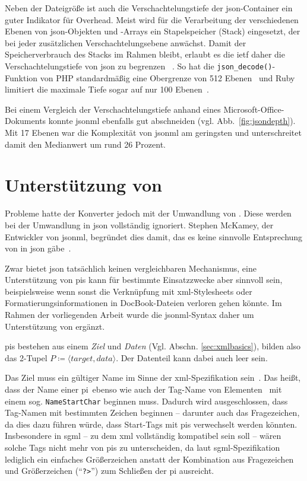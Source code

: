 Neben der Dateigröße ist auch die Verschachtelungstiefe der \acrshort{json}-Container ein guter Indikator für Overhead. Meist wird für die Verarbeitung der verschiedenen Ebenen von \acrshort{json}-Objekten und -Arrays ein Stapelspeicher (Stack) eingesetzt, der bei jeder zusätzlichen Verschachtelungsebene anwächst. Damit der Speicherverbrauch des Stacks im Rahmen bleibt, erlaubt es die \acrshort{ietf} daher die Verschachtelungstiefe von \acrshort{json} zu begrenzen ~\cite[Abschn.~9]{rfc7159}. So hat die \texttt{json_decode()}-Funktion von PHP standardmäßig eine Obergrenze von 512 Ebenen~\cite{php-json} und Ruby limitiert die maximale Tiefe sogar auf nur 100 Ebenen~\cite{ruby-json}.

Bei einem Vergleich der Verschachtelungstiefe anhand eines Microsoft\hyp{}Office\hyp{}Dokuments konnte \acrshort{jsonml} ebenfalls gut abschneiden (vgl. Abb.~\ref{fig:jsondepth}). Mit 17 Ebenen war die Komplexität von \acrshort{jsonml} am geringsten und unterschreitet damit den Medianwert um rund 26 Prozent.

\section{Unterstützung von }

Probleme hatte der Konverter jedoch mit der Umwandlung von . Diese werden bei der Umwandlung in \acrshort{json} vollständig ignoriert. Stephen McKamey, der Entwickler von \acrshort{jsonml}, begründet dies damit, das es keine sinnvolle Entsprechung von  in \acrshort{json} gäbe~\cite{mckamey2006xml}.

Zwar bietet \acrshort{json} tatsächlich keinen vergleichbaren Mechanismus, eine Unterstützung von \glspl{pi} kann für bestimmte Einsatzzwecke aber sinnvoll sein, beispielsweise wenn sonst die Verknüpfung mit \acrshort{xml}-Stylesheets oder Formatierungsinformationen in DocBook\hyp{}Dateien verloren gehen könnte. Im Rahmen der vorliegenden Arbeit wurde die \acrshort{jsonml}-Syntax daher um Unterstützung von  ergänzt.

\glspl{pi} bestehen aus einem \emph{Ziel} und \emph{Daten} (Vgl. Abschn. \ref{sec:xmlbasics}), bilden also das 2-Tupel $P \coloneqq \langle target, data \rangle$. Der Datenteil kann dabei auch leer sein.

Das Ziel muss ein gültiger Name im Sinne der \acrshort{xml}-Spezifikation sein~\cite[{Regel~[17]}]{xml}. Das heißt, dass der Name einer \gls{pi}\ ebenso wie auch der Tag-Name von Elementen~\cite[{Regel~[40]}]{xml} mit einem sog. \texttt{NameStartChar} beginnen muss. Dadurch wird ausgeschlossen, dass Tag-Namen mit bestimmten Zeichen beginnen -- darunter auch das Fragezeichen, da dies dazu führen würde, dass Start-Tags mit \glspl{pi} verwechselt werden könnten. Insbesondere in \acrshort{sgml} -- zu dem \acrshort{xml} vollständig kompatibel sein soll -- wären solche Tags nicht mehr von \glspl{pi} zu unterscheiden, da laut \acrshort{sgml}-Spezifikation lediglich ein einfaches Größerzeichen anstatt der Kombination aus Fragezeichen und Größerzeichen (\enquote{\texttt{?>}}) zum Schließen der \gls{pi} ausreicht.

